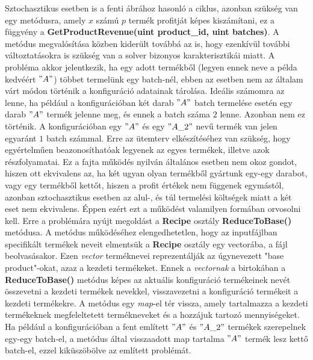 Sztochasztikus esetben is a fenti ábrához hasonló a ciklus, azonban szükség van egy metódusra, amely $x$ számú $p$ termék profitját képes kiszámítani, ez a függvény a \textbf{GetProductRevenue(uint product\_id, uint batches)}. A metódus megvalósítása közben kiderült továbbá az is, hogy ezenkívül további változtatásokra is szükség van a solver bizonyos karakterisztikái miatt. A probléma akkor jelentkezik, ha egy adott termékből (legyen ennek neve a példa kedvéért $"A"$) többet termelünk egy batch-nél, ebben az esetben nem az általam várt módon történik a konfiguráció adatainak tárolása. Ideális számomra az lenne, ha például a konfigurációban két darab $"A"$ batch termelése esetén egy darab $"A"$ termék jelenne meg, és ennek a batch száma $2$ lenne. Azonban nem ez történik. A konfigurációban egy $"A"$ és egy $"A\_2"$ nevű termék van jelen egyaránt $1$ batch számmal. Erre az ütemterv elkészítéséhez van szükség, hogy egyértelműen beazonosíthatóak legyenek az egyes termékek, illetve azok részfolyamatai. Ez a fajta működés nyilván általános esetben nem okoz gondot, hiszen ott ekvivalens az, ha két ugyan olyan termékből gyártunk egy-egy darabot, vagy egy termékből kettőt, hiszen a profit értékek nem függenek egymástól, azonban sztochasztikus esetben az alul-, és túl termelési költségek miatt a két eset nem ekvivalens. Éppen ezért ezt a működést valamilyen formában orvosolni kell. Erre a problémára nyújt megoldást a \textbf{Recipe} osztály \textbf{ReduceToBase()} metódusa. A metódus működéséhez elengedhetetlen, hogy az inputfájlban specifikált termékek neveit elmentsük a \textbf{Recipe} osztály egy vectorába, a fájl beolvasásakor. Ezen \textit{vector} terméknevei reprezentálják az úgynevezett "base product"-okat, azaz a kezdeti termékeket. Ennek a \textit{vectornak} a birtokában a \textbf{ReduceToBase()} metódus képes az aktuális konfiguráció termékeinek nevét összevetni a kezdeti termékek nevekkel, visszavezetni a konfiguráció termékeit a kezdeti termékekre. A metódus egy \textit{map}-el tér vissza, amely tartalmazza a kezdeti termékeknek megfeleltetett termékneveket és a hozzájuk tartozó mennyiségeket. Ha például a konfigurációban a fent említett $"A"$ és $"A\_2"$ termékek szerepelnek egy-egy batch-el, a metódus által visszaadott map tartalma $"A"$ termék lesz kettő batch-el, ezzel kiküszöbölve az említett problémát.

